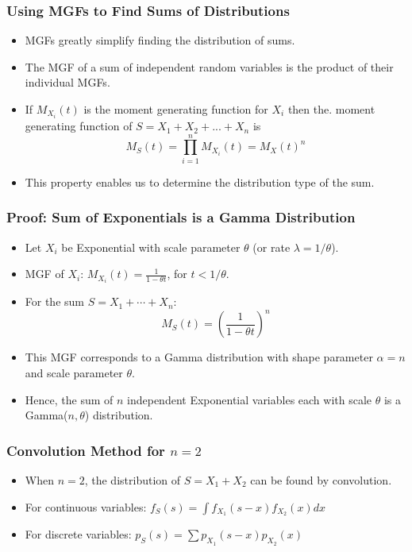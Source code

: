 \documentclass[compress,mathserif]{beamer}
\begin{document}
\begin{frame}
\frametitle{Using MGFs to Find Sums of Distributions}
\begin{itemize}
    \item MGFs greatly simplify finding the distribution of sums.
    \item The MGF of a sum of independent random variables is the product of their individual MGFs.
    \item If $M_{X_i}(t)$ is the moment generating function for $X_i$ then the. moment generating function of $S = X_1 + X_2 + ... + X_n$ is \[M_S(t) = \prod_{i=1}^n M_{X_i}(t) = M_X(t)^n\]
    \item This property enables us to determine the distribution type of the sum.
\end{itemize}
\end{frame}


\begin{frame}
\frametitle{Proof: Sum of Exponentials is a Gamma Distribution}
\begin{itemize}
    \item Let \( X_i \) be Exponential with scale parameter \(\theta\) (or rate \(\lambda = 1/\theta\)).
    \item MGF of \( X_i \): \( M_{X_i}(t) = \frac{1}{1 - \theta t} \), for \( t < 1/\theta \).
    \item For the sum \( S = X_1 + \cdots + X_n \):
          \[ M_S(t) = \left(\frac{1}{1 - \theta t}\right)^n \]
    \item This MGF corresponds to a Gamma distribution with shape parameter \(\alpha = n\) and scale parameter \(\theta\).
    \item Hence, the sum of \( n \) independent Exponential variables each with scale \(\theta\) is a Gamma(\(n, \theta\)) distribution.
\end{itemize}
\end{frame}


\begin{frame}
\frametitle{Convolution Method for \( n = 2 \)}
\begin{itemize}
    \item When \( n = 2 \), the distribution of \( S = X_1 + X_2 \) can be found by convolution.
    \item For continuous variables: \( f_S(s) = \int f_{X_1}(s - x) f_{X_2}(x) dx \)
    \item For discrete variables: \( p_S(s) = \sum p_{X_1}(s - x) p_{X_2}(x) \)
\end{itemize}
\end{frame}
\end{document}
